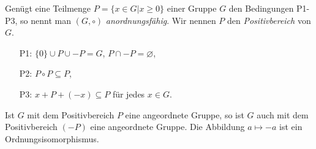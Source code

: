 %
%
\begin{bem}\label{afG} %
%
Genügt eine Teilmenge $P = \lbrace x \in G | x \geq 0\rbrace$ einer Gruppe $G$ den Bedingungen P1- P3, so nennt man $\left(G,\circ\right)$ \textit{anordnungsfähig}. Wir nennen $P$ den \textit{Positivbereich} von $G$.
%
\begin{enumerate}
\item[P1:] $\lbrace0\rbrace \cup P\cup -P = G$, $P \cap -P = \varnothing$,
\item[P2:] $P \circ P \subseteq P$,
\item[P3:] $x+P+(-x) \subseteq P$ für jedes $x \in G$.
\end{enumerate}

\end{bem}
%
%
%
\begin{bsp}
Ist $G$ mit dem Positivbereich $P$ eine angeordnete Gruppe, so ist $G$ auch mit dem Positivbereich $(-P)$ eine angeordnete Gruppe. Die Abbildung $a \mapsto -a$ ist ein Ordnungsisomorphismus.
\end{bsp}
%

